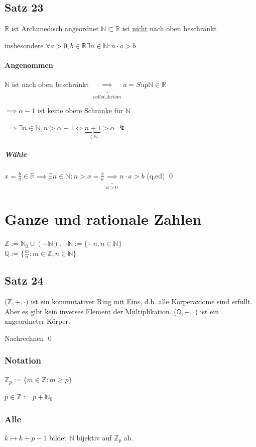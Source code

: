 \documentclass[fleqn]{scrbook}
\newcommand{\R}{\mathbb{R}}
\newcommand{\N}{\mathbb{N}}
\renewenvironment{proof}{{\bfseries Beweis }}{\qed}
\begin{document}
\subsection{Satz 23} $\R$ ist Archimedisch angeordnet $\N \subset \R$ ist \underline{nicht} nach oben beschränkt

insbesondere $\forall a > 0, b \in \R \exists n \in \N: n  \cdot  a > b$

\begin{proof}
\paragraph*{Angenommen} $\N$ ist nach oben beschränkt $\underbrace{\implies}_{vollst. Axiom} a = Sup\N\in\R$

$\implies \alpha - 1$ ist keine obere Schranke für $\N$

$\implies \exists n \in \N, n > \alpha - 1 \iff  \underbrace{n+1}_{\in \N} > \alpha$ $\lightning$
\subparagraph{Wähle}
$x = \frac{b}{a} \in \R \implies \exists n \in \N: n > x = \frac{b}{a} \underbrace{\implies}_{a > 0} n \cdot  a > b$ (q.ed)
\end{proof}
\section{Ganze und rationale Zahlen}
$\mathbb{Z} := \N_0 \cup (-\N), -\N := \{-n, n \in \N\}$\\$\mathbb{Q}:=\{\frac{m}{n}: m\in\mathbb{Z},n \in\N\}$
\subsection{Satz 24}
($\mathbb{Z}, +,  \cdot $) ist ein kommutativer Ring mit Eins, d.h. alle Körperaxiome sind erfüllt. Aber es gibt kein inverses Element der Multiplikation. ($\mathbb{Q}, +,  \cdot $) ist ein angeordneter Körper.

\begin{proof}
	Nachrechnen
\end{proof}
\subsubsection{Notation}$\mathbb{Z}_p := \{ m\in\mathbb{Z}: m\geq p\}$

$p \in \mathbb{Z} := p + \N_0$
\subsubsection{Alle} $k \mapsto k + p - 1$ bildet $\N$ bijektiv auf $\mathbb{Z}_p$ ab.
\end{document}
